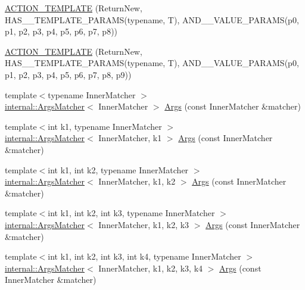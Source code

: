\begin{DoxyCompactItemize}
\item 
\mbox{\hyperlink{namespacetesting_adfb5791a941ec1f2a2f8067fd9ac7667}{A\+C\+T\+I\+O\+N\+\_\+\+T\+E\+M\+P\+L\+A\+TE}} (Return\+New, H\+A\+S\+\_\+\_\+\+T\+E\+M\+P\+L\+A\+T\+E\+\_\+\+P\+A\+R\+A\+MS(typename, T), A\+N\+D\+\_\+\_\+\+V\+A\+L\+U\+E\+\_\+\+P\+A\+R\+A\+MS(p0, p1, p2, p3, p4, p5, p6, p7, p8))
\item 
\mbox{\hyperlink{namespacetesting_a3934a47f6125504c939a3573b7fc55c4}{A\+C\+T\+I\+O\+N\+\_\+\+T\+E\+M\+P\+L\+A\+TE}} (Return\+New, H\+A\+S\+\_\+\_\+\+T\+E\+M\+P\+L\+A\+T\+E\+\_\+\+P\+A\+R\+A\+MS(typename, T), A\+N\+D\+\_\+\_\+\+V\+A\+L\+U\+E\+\_\+\+P\+A\+R\+A\+MS(p0, p1, p2, p3, p4, p5, p6, p7, p8, p9))
\item 
{\footnotesize template$<$typename Inner\+Matcher $>$ }\\\mbox{\hyperlink{classtesting_1_1internal_1_1ArgsMatcher}{internal\+::\+Args\+Matcher}}$<$ Inner\+Matcher $>$ \mbox{\hyperlink{namespacetesting_aaca153f67b689b8b9d5b8c67ecf8cee4}{Args}} (const Inner\+Matcher \&matcher)
\item 
{\footnotesize template$<$int k1, typename Inner\+Matcher $>$ }\\\mbox{\hyperlink{classtesting_1_1internal_1_1ArgsMatcher}{internal\+::\+Args\+Matcher}}$<$ Inner\+Matcher, k1 $>$ \mbox{\hyperlink{namespacetesting_af67bac6da407df7586f60cfa2c9b602d}{Args}} (const Inner\+Matcher \&matcher)
\item 
{\footnotesize template$<$int k1, int k2, typename Inner\+Matcher $>$ }\\\mbox{\hyperlink{classtesting_1_1internal_1_1ArgsMatcher}{internal\+::\+Args\+Matcher}}$<$ Inner\+Matcher, k1, k2 $>$ \mbox{\hyperlink{namespacetesting_a663409e441584c81f496e9c98fd3453c}{Args}} (const Inner\+Matcher \&matcher)
\item 
{\footnotesize template$<$int k1, int k2, int k3, typename Inner\+Matcher $>$ }\\\mbox{\hyperlink{classtesting_1_1internal_1_1ArgsMatcher}{internal\+::\+Args\+Matcher}}$<$ Inner\+Matcher, k1, k2, k3 $>$ \mbox{\hyperlink{namespacetesting_abd3ddae153e1c452b7625808cc4d820b}{Args}} (const Inner\+Matcher \&matcher)
\item 
{\footnotesize template$<$int k1, int k2, int k3, int k4, typename Inner\+Matcher $>$ }\\\mbox{\hyperlink{classtesting_1_1internal_1_1ArgsMatcher}{internal\+::\+Args\+Matcher}}$<$ Inner\+Matcher, k1, k2, k3, k4 $>$ \mbox{\hyperlink{namespacetesting_aeff7e644fd00516c3519fe8c0dc1aee2}{Args}} (const Inner\+Matcher \&matcher)

\end{DoxyCompactItemize}
